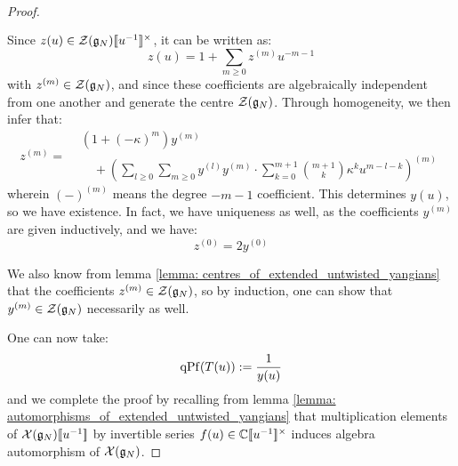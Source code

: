 \begin{proof}
$$\begin{aligned}
\begin{aligned}
                                \end{aligned}
                            \end{aligned}
                        $$
                    Since $z(u) \in \calZ(\g_N)[\![u^{-1}]\!]^{\x}$, it can be written as:
                        $$z(u) = 1 + \sum_{m \geq 0} z^{(m)} u^{-m - 1}$$
                    with $z^{(m)} \in \mathcal{Z}(\mathfrak{g}_N)$, and since these coefficients are algebraically independent from one another and generate the centre $\mathcal{Z}(\mathfrak{g}_N)$. Through homogeneity, we then infer that:
                        $$
                            z^{(m)} =
                            \begin{aligned}
                                & (1 + (-\kappa)^m) y^{(m)}
                                \\
                                & \quad + \left( \sum_{l \geq 0} \sum_{m \geq 0} y^{(l)} y^{(m)} \cdot \sum_{k = 0}^{m + 1} \binom{m + 1}{k} \kappa^k u^{m - l - k} \right)^{(m)} 
                            \end{aligned}
                        $$
                    wherein $(-)^{(m)}$ means the degree $-m - 1$ coefficient. This determines $y(u)$, so we have existence. In fact, we have uniqueness as well, as the coefficients $y^{(m)}$ are given inductively, and we have:
                        $$z^{(0)} = 2y^{(0)}$$

                    We also know from lemma \ref{lemma: centres_of_extended_untwisted_yangians} that the coefficients $z^{(m)} \in \mathcal{Z}(\mathfrak{g}_N)$, so by induction, one can show that $y^{(m)} \in \mathcal{Z}(\mathfrak{g}_N)$ necessarily as well. 
                        
                    One can now take:
                        $$\operatorname{qPf}( T(u) ) := \frac{1}{y(u)}$$
                    and we complete the proof by recalling from lemma \ref{lemma: automorphisms_of_extended_untwisted_yangians} that multiplication elements of $\mathcal{X}(\mathfrak{g}_N)[\![u^{-1}]\!]$ by invertible series $f(u) \in \bbC[\![u^{-1}]\!]^{\x}$ induces algebra automorphism of $\mathcal{X}(\mathfrak{g}_N)$. 
                \end{proof}
